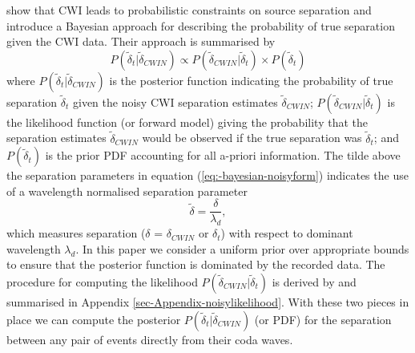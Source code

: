 \documentclass[extra, onecolumn, doublespacing]{gji}
\begin{document}
\citet{dr_Robinson11a} show that CWI leads to
probabilistic constraints on source separation and introduce a
Bayesian approach for describing the probability of true separation
given the CWI data. Their approach is summarised by
\begin{equation}
\label{eq:-bayesian-noisyform}
P(\widetilde{\delta}_t|\widetilde{\delta}_{CWIN}) \propto P(\widetilde{\delta}_{CWIN}|\widetilde{\delta}_t)
\times P(\widetilde{\delta}_t)
\end{equation}
where  $P(\widetilde{\delta}_t|\widetilde{\delta}_{CWIN})$ is the
posterior function indicating the probability of true separation
$\widetilde{\delta}_t$ given the noisy CWI separation estimates
$\widetilde{\delta}_{CWIN}$;
$P(\widetilde{\delta}_{CWIN}|\widetilde{\delta}_t)$ is the
likelihood function (or forward model) giving the probability that
the separation estimates $\widetilde{\delta}_{CWIN}$ would be
observed if the true separation was $\widetilde{\delta}_t$; and
$P(\widetilde{\delta}_t)$ is the prior PDF accounting for all
a-priori information. The tilde above the separation parameters in
equation (\ref{eq:-bayesian-noisyform}) indicates the use of a
wavelength normalised separation parameter
\begin{equation}
\label{eq-normalisation-eqn}
\widetilde{\delta} = \frac{\delta}{\lambda_{d}},
\end{equation}
which measures separation ($\delta$ = $\delta_{CWIN}$ or $\delta_t$)
with respect to dominant wavelength $\lambda_{d}$. In this paper we
consider a uniform prior over appropriate bounds to ensure that the
posterior function is dominated by the recorded data.
The procedure for computing the likelihood
$P(\widetilde{\delta}_{CWIN}|\widetilde{\delta}_t)$ is derived by
\citet{dr_Robinson11a} and summarised in Appendix
\ref{sec-Appendix-noisylikelihood}. With these two pieces in place
we can compute the posterior
$P(\widetilde{\delta}_t|\widetilde{\delta}_{CWIN})$ (or PDF) for the
separation between any pair of events directly from their coda
waves.
\end{document}
